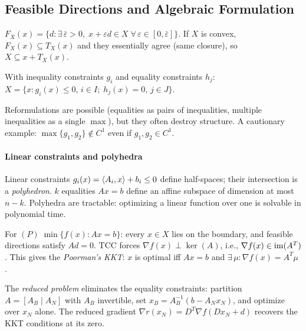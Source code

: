 \subsection{Feasible Directions and Algebraic Formulation}\label{sec:feasible-directions}

\begin{definition}\label{def:feasible-dir}
	$F_X(x) = \{d : \exists\, \bar{\varepsilon} > 0,\; x + \varepsilon d \in X\;\forall\, \varepsilon \in [0, \bar{\varepsilon}]\}$.
	If $X$ is convex, $F_X(x) \subseteq T_X(x)$ and they essentially agree (same closure), so $X \subseteq x + T_X(x)$.
\end{definition}

\begin{definition}\label{def:algebraic}
	With inequality constraints $g_i$ and equality constraints $h_j$:
	$X = \{x : g_i(x) \leq 0,\, i \in I;\; h_j(x) = 0,\, j \in J\}$.
\end{definition}

Reformulations are possible (equalities as pairs of inequalities, multiple inequalities as a single $\max$), but they often destroy structure.
A cautionary example: $\max\{g_1, g_2\} \notin C^1$ even if $g_1, g_2 \in C^1$.

\paragraph{Linear constraints and polyhedra}

Linear constraints $g_i(x) = \langle A_i, x\rangle + b_i \leq 0$ define half-spaces; their intersection is a \emph{polyhedron}.
$k$ equalities $Ax = b$ define an affine subspace of dimension at most $n - k$.
Polyhedra are tractable: optimizing a linear function over one is solvable in polynomial time.

For $(P)\; \min\{f(x) : Ax = b\}$: every $x \in X$ lies on the boundary, and feasible directions satisfy $Ad = 0$.
TCC forces $\nabla f(x) \perp \ker(A)$, i.e., $\nabla f(x) \in \operatorname{im}(A^T)$.
This gives the \emph{Poorman's KKT}: $x$ is optimal iff $Ax = b$ and $\exists\, \mu : \nabla f(x) = A^T \mu$ \cite{luenberger2008}.

The \emph{reduced problem} eliminates the equality constraints: partition $A = [A_B \mid A_N]$ with $A_B$ invertible, set $x_B = A_B^{-1}(b - A_N x_N)$, and optimize over $x_N$ alone.
The reduced gradient $\nabla r(x_N) = D^T \nabla f(Dx_N + d)$ recovers the KKT conditions at its zero.


